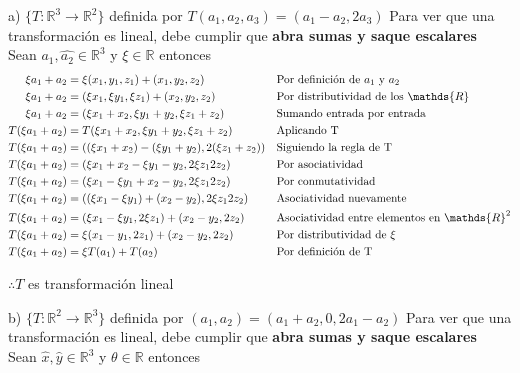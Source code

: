 \documentclass[letterpaper]{article}
\newcommand{\R}{\mathds{R}}
\renewcommand{\*}{\cdot}
\theoremstyle{definition}
\begin{document}
	a) $\lbrace T: \mathbb{R}^{3} \longrightarrow \mathbb{R}^{2} \rbrace $ definida por $T(a_{1},a_{2},a_{3}) = (a_{1} - a_{2}, 2a_{3})$
	Para ver que una transformación es lineal, debe cumplir que \textbf{abra sumas y saque escalares}\\
	Sean $ \hat{a_1}, \hat{a_2} \in \R^3 $ y $ \xi \in \R $ entonces
	\begin{align*}
		\xi a_1 + a_2 &= \xi(x_1,y_1,z_1) + (x_1, y_2,z_2) && \text{Por definición de $ a_1 $ y $ a_2 $}\\
		\xi a_1 + a_2 &= (\xi x_1,\xi y_1,\xi z_1) + (x_2, y_2,z_2)&& \text{Por distributividad de los $ \R $}\\
		\xi a_1 + a_2 &= (\xi x_1 +x_2,\xi y_1 + y_2,\xi z_1 + z_2)&& \text{Sumando entrada por entrada}\\
		T(\xi a_1 + a_2) &= T(\xi x_1 +x_2,\xi y_1 + y_2,\xi z_1 + z_2)&&\text{Aplicando T} \\
		T(\xi a_1 + a_2) &= ((\xi x_1 +x_2) -(\xi y_1 + y_2),2(\xi z_1 + z_2))&& \text{Siguiendo la regla de T} \\
		T(\xi a_1 + a_2) &= (\xi x_1 +x_2 -\xi y_1 - y_2,2\xi z_1  2z_2)&& \text{Por asociatividad}\\
		T(\xi a_1 + a_2) &= (\xi x_1 -\xi y_1 +x_2 - y_2,2\xi z_1  2z_2)&& \text{Por conmutatividad} \\
		T(\xi a_1 + a_2) &= ((\xi x_1 -\xi y_1) + (x_2 - y_2),2\xi z_1  2z_2)&& \text{Asociatividad nuevamente}\\
		T(\xi a_1 + a_2) &= (\xi x_1 -\xi y_1, 2\xi z_1) + (x_2 - y_2, 2z_2)&& \text{Asociatividad entre elementos en $ \R^2 $}\\
		T(\xi a_1 + a_2) &= \xi( x_1 - y_1, 2z_1) + (x_2 - y_2, 2z_2)&& \text{Por distributividad de $ \xi $} \\
		T(\xi a_1 + a_2) &= \xi T(a_1) + T(a_2) && \text{Por definición de T}
	\end{align*}
	\begin{center}
		$ \therefore T $ es transformación lineal
	\end{center}	
	
	

	b) $\lbrace T: \mathbb{R}^{2} \longrightarrow \mathbb{R}^{3} \rbrace$ definida por $(a_{1},a_{2}) = (a_{1} + a_{2}, 0, 2a_{1} - a_{2})$
	Para ver que una transformación es lineal, debe cumplir que \textbf{abra sumas y saque escalares}\\
	Sean $ \hat{x}, \hat{y} \in \R^3 $ y $ \theta \in \R $ entonces
	
\end{document}
